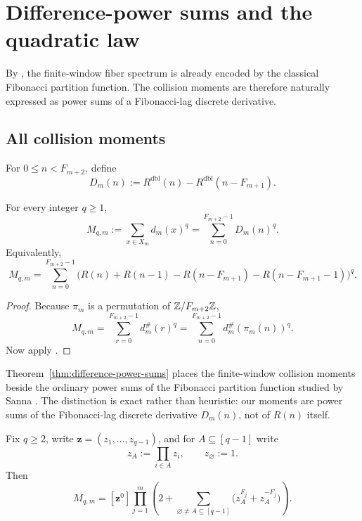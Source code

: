 \section{Difference-power sums and the quadratic law}
\label{sec:second-collision}

By , the finite-window fiber spectrum is already
encoded by the classical Fibonacci partition function.  The collision moments
are therefore naturally expressed as power sums of a Fibonacci-lag discrete
derivative.

\subsection{All collision moments}

\begin{definition}
\label{def:difference-spectrum}
For \(0\le n<F_{m+2}\), define
\[
  D_m(n):=R^{\mathrm{dbl}}(n)-R^{\mathrm{dbl}}(n-F_{m+1}).
\]
\end{definition}

\begin{theorem}
\label{thm:difference-power-sums}
For every integer \(q\ge 1\),
\[
  M_{q,m}:=\sum_{x\in X_m}d_m(x)^q
  =
  \sum_{n=0}^{F_{m+2}-1} D_m(n)^q.
\]
Equivalently,
\[
  M_{q,m}
  =
  \sum_{n=0}^{F_{m+2}-1}
  \bigl(
    R(n)+R(n-1)-R(n-F_{m+1})-R(n-F_{m+1}-1)
  \bigr)^q.
\]
\end{theorem}

\begin{proof}
Because \(\pi_m\) is a permutation of \(\mathbb{Z}/F_{m+2}\mathbb{Z}\),
\[
  M_{q,m}
  =
  \sum_{r=0}^{F_{m+2}-1} d_m^\#(r)^q
  =
  \sum_{n=0}^{F_{m+2}-1} d_m^\#(\pi_m(n))^q.
\]
Now apply .
\end{proof}

\begin{remark}
\label{rem:sanna-relation}
Theorem~\ref{thm:difference-power-sums} places the finite-window collision
moments beside the ordinary power sums of the Fibonacci partition function
studied by Sanna \cite{Sanna2025}.  The distinction is exact rather than
heuristic: our moments are power sums of the Fibonacci-lag discrete derivative
\(D_m(n)\), not of \(R(n)\) itself.
\end{remark}

\begin{corollary}
\label{cor:multivariate-moment-kernel}
Fix \(q\ge 2\), write \(\mathbf z=(z_1,\dots,z_{q-1})\), and for
\(A\subseteq [q-1]\) write
\[
  z_A:=\prod_{i\in A}z_i,
  \qquad
  z_\varnothing:=1.
\]
Then
\[
  M_{q,m}
  =
  [\mathbf z^0]
  \prod_{j=1}^m
  \left(
    2+\sum_{\varnothing\neq A\subseteq [q-1]}
    \bigl(z_A^{F_j}+z_A^{-F_j}\bigr)
  \right).
\]
\end{corollary}

